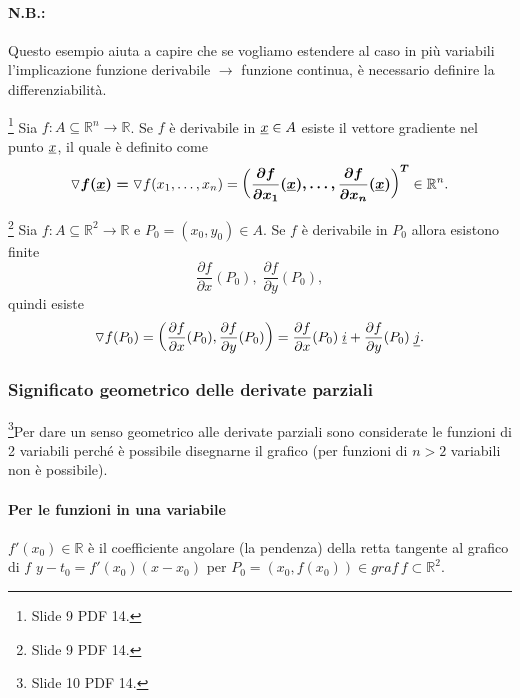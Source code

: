 \paragraph{N.B.:} Questo esempio aiuta a capire che se vogliamo estendere al caso in più variabili l'implicazione funzione derivabile $\rightarrow$ funzione continua, è necessario definire la differenziabilità.

\begin{definition}[Gradiente]\footnote{Slide 9 PDF 14.}
   Sia $f:A\subseteq\mathbb R^n\rightarrow\mathbb R$. Se $f$ è derivabile in $\uline x\in A$ esiste il vettore gradiente nel punto $\uline x$, il quale è definito come
   \begin{equation}
       \boldsymbol{\triangledown f(\uline x)=}\triangledown f(x_1,\hdots, x_n)=\boldsymbol{\left(\frac{\partial f}{\partial x_1}(\uline x),\hdots, \frac{\partial f}{\partial x_n}(\uline x)\right)^T}\in\mathbb R^n.
   \end{equation}
\end{definition}

\begin{example}\footnote{Slide 9 PDF 14.}
    Sia $f:A\subseteq\mathbb R^2\rightarrow\mathbb R$ e $P_0=(x_0,y_0)\in A$. Se $f$ è derivabile in $P_0$ allora esistono finite
    \begin{equation*}
        \frac{\partial f}{\partial x}(P_0),\; \frac{\partial f}{\partial y}(P_0),
    \end{equation*}
    quindi esiste
    \begin{equation*}
        \triangledown f(P_0)=\left(\frac{\partial f}{\partial x}(P_0),\frac{\partial f}{\partial y}(P_0)\right)=\frac{\partial f}{\partial x}(P_0)\; \uline i+ \frac{\partial f}{\partial y}(P_0)\; \uline j.
    \end{equation*}
\end{example}

\subsubsection{Significato geometrico delle derivate parziali}
\footnote{Slide 10 PDF 14.}Per dare un senso geometrico alle derivate parziali sono considerate le funzioni di 2 variabili perché è possibile disegnarne il grafico (per funzioni di $n>2$ variabili non è possibile).

\paragraph{Per le funzioni in una variabile} $f'(x_0)\in\mathbb R$ è il coefficiente angolare (la pendenza) della retta tangente al grafico di $f$ $y-t_0=f'(x_0)(x-x_0)$ per $P_0=(x_0,f(x_0))\in graf\, f\subset \mathbb R^2$.

